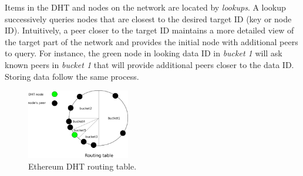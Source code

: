 Items in the DHT and nodes on the network are located by \emph{lookups}. A lookup successively queries nodes that are closest to the desired target ID (key or node ID). Intuitively, a peer closer to the target ID maintains a more detailed view of the target part of the network and provides the initial node with additional peers to query. For instance, the green node in  looking data ID in \emph{bucket 1} will ask known peers in \emph{bucket 1} that will provide additional peers closer to the data ID. Storing data follow the same process.  

\begin{figure}
    \includegraphics[width=0.4\textwidth]{img/kademlia}
    \caption{Ethereum DHT routing table.}
    \label{fig:kademlia}
 \end{figure}

